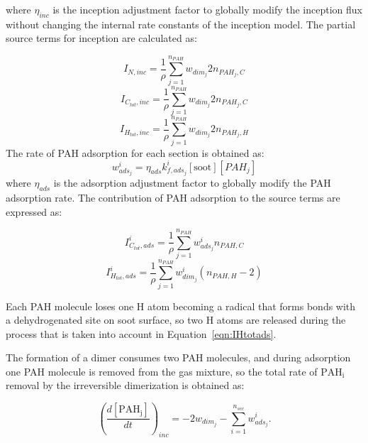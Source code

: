 \noindent where $\eta_{inc}$ is the inception adjustment factor to globally modify the inception flux without changing the internal rate constants of the inception model. The partial source terms for inception are calculated as:

\begin{equation}
	I_{N,inc} =\frac{1}{\rho} \sum_{j=1}^{n_{PAH}} w_{dim_j} 2n_{PAH_j,C}
	\label{eqn:INinc}
\end{equation}
\begin{equation}
	I_{C_{tot},inc} = \frac{1}{\rho}\sum_{j=1}^{n_{PAH}} w_{dim_j} 2n_{PAH_j,C}
	\label{eqn:ICtotinc}
\end{equation}
\begin{equation}
	I_{H_{tot},inc} =\frac{1}{\rho} \sum_{j=1}^{n_{PAH}} w_{dim_j} 2n_{PAH_j,H}
	\label{eqn:IHtotinc}
\end{equation}
The rate of PAH adsorption for each section is obtained as:
\begin{equation}
	w^i_{ads_j} = \eta_{ads} k^i_{f,ads_{j}} [\mathrm{soot}] [PAH_j]
	\label{eqn:adsrate_irrevdim}
\end{equation}
\noindent where $\eta_{ads}$ is the adsorption adjustment factor to globally modify the PAH adsorption rate. The contribution of PAH adsorption to the source terms are expressed as:

\begin{equation}
	I^i_{C_{tot},ads} = \frac{1}{\rho}\sum_{j=1}^{n_{PAH}} w^i_{ads_j} n_{PAH,C}
	\label{eqn:ICtotads}
\end{equation}
\begin{equation}
	I^i_{H_{tot},ads} =\frac{1}{\rho} \sum_{j=1}^{n_{PAH}} w^i_{dim_j} (n_{PAH,H}-2)
	\label{eqn:IHtotads}
\end{equation}


Each PAH molecule loses one H atom becoming a radical that forms bonds with a dehydrogenated site on soot surface, so two H atoms are released during the process that is taken into account in Equation~\eqref{eqn:IHtotads}.

The formation of a dimer consumes two PAH molecules, and during adsorption one PAH molecule is removed from the gas mixture, so the total rate of $\mathrm{PAH_i}$ removal by the irreversible dimerization is obtained as:

\begin{equation}
	\left(
	\frac{d\left[{\mathrm{PAH_j}}\right]}{dt}
	\right)_{inc}
	= 
	-2w_{dim_j}-\sum_{i=1}^{n_{sec}}w^i_{ads_j}
	\label{eqn:PAHscrub_irrevdim}.
\end{equation}

